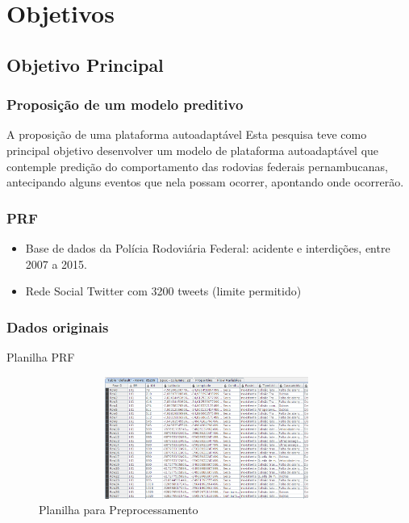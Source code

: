 \documentclass[11pt]{beamer}
\begin{document}
\section{ Objetivos}
\subsection{ Objetivo Principal}
\begin{frame}\frametitle{Proposição de um modelo preditivo}
	\pause
	\begin{block}{A proposição de uma plataforma autoadaptável}
		Esta pesquisa teve como principal objetivo desenvolver um modelo de plataforma autoadaptável 
		\pause que contemple predição do comportamento das rodovias federais pernambucanas,
		\pause antecipando alguns eventos que nela possam ocorrer, apontando onde ocorrerão.
		
	\end{block}
\end{frame}


\begin{frame}\frametitle{PRF}
		\begin{itemize}
		  \item Base de dados da Polícia Rodoviária Federal: acidente e interdições, entre 2007 a 2015.
		  \pause
		  \item Rede Social Twitter com 3200 tweets (limite permitido)
		\end{itemize}	
		
		
\end{frame}


\begin{frame}\frametitle{ Dados originais}
\transblindshorizontal[duration=2, direction=25]	
	\begin{block}{ Planilha PRF}
		\begin{figure}[!ht]
			\centering %
			\caption{Planilha para Preprocessamento}
			\includegraphics[width=110mm, height=40mm]{Figuras/BigData/PlanilhaPRF.png}
		\end{figure}
	\end{block}
\end{frame}
\end{document}
